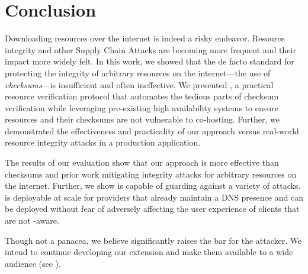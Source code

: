 \section{Conclusion} \label{sec:conclusion}

Downloading resources over the internet is indeed a risky endeavor. Resource
integrity and other Supply Chain Attacks are becoming more frequent and their
impact more widely felt. In this work, we showed that the de facto standard for
protecting the integrity of arbitrary resources on the internet---the use of
\emph{checksums}---is insufficient and often ineffective. We presented
\SYSTEM{}, a practical resource verification protocol that automates the tedious
parts of checksum verification while leveraging pre-existing high availability
systems to ensure resources and their checksums are not vulnerable to
co-hosting. Further, we demonstrated the effectiveness and practicality of our
approach versus real-world resource integrity attacks in a production
application.

The results of our evaluation show that our approach is more effective than
checksums and prior work mitigating integrity attacks for arbitrary resources on
the internet. Further, we show \SYSTEM{} is capable of guarding against a
variety of attacks. \SYSTEM{} is deployable at scale for providers that already
maintain a DNS presence and can be deployed without fear of adversely affecting
the user experience of clients that are not \SYSTEM{}-aware.

Though not a panacea, we believe \SYSTEM{} significantly raises the bar for the
attacker. We intend to continue developing our extension and make them available
to a wide audience (see ).
